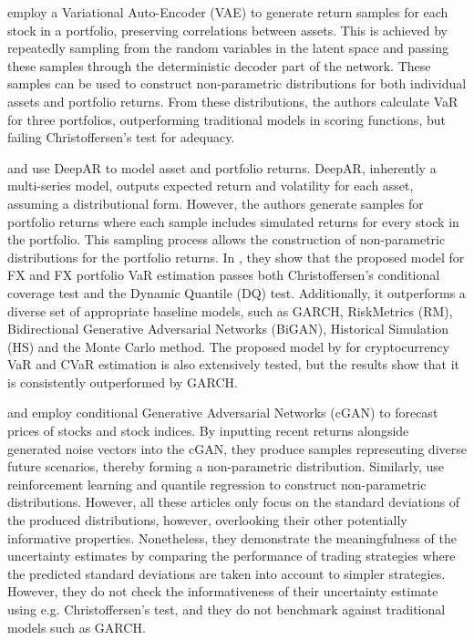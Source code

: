 \textcite{arian2022encoded} employ a Variational Auto-Encoder (VAE) to generate return samples for each stock in a portfolio, preserving correlations between assets. This is achieved by repeatedly sampling from the random variables in the latent space and passing these samples through the deterministic decoder part of the network. These samples can be used to construct non-parametric distributions for both individual assets and portfolio returns. From these distributions, the authors calculate VaR for three portfolios, outperforming traditional models in scoring functions, but failing Christoffersen's test for adequacy.

\textcite{Fatouros2023DeepVaR} and \textcite{Almeida2024RiskForecasting} use DeepAR to model asset and portfolio returns. DeepAR, inherently a multi-series model, outputs expected return and volatility for each asset, assuming a distributional form. However, the authors generate samples for portfolio returns where each sample includes simulated returns for every stock in the portfolio. This sampling process allows the construction of non-parametric distributions for the portfolio returns. In \textcite{Fatouros2023DeepVaR}, they show that the proposed model for FX and FX portfolio VaR estimation passes both Christoffersen's conditional coverage test and the Dynamic Quantile (DQ) test. Additionally, it outperforms a diverse set of appropriate baseline models, such as GARCH, RiskMetrics (RM), Bidirectional Generative
Adversarial Networks (BiGAN), Historical Simulation (HS) and the Monte Carlo method. The proposed model by \textcite{Almeida2024RiskForecasting} for cryptocurrency VaR and CVaR estimation is also extensively tested, but the results show that it is consistently outperformed by GARCH.

\textcite{lee2021estimation} and \textcite{vuletic2024finGAN} employ conditional Generative Adversarial Networks (cGAN) to forecast prices of stocks and stock indices. By inputting recent returns alongside generated noise vectors into the cGAN, they produce samples representing diverse future scenarios, thereby forming a non-parametric distribution. Similarly, \textcite{Park2024UncertaintyAware} use reinforcement learning and quantile regression to construct non-parametric distributions. However, all these articles only focus on the standard deviations of the produced distributions, however, overlooking their other potentially informative properties. Nonetheless, they demonstrate the meaningfulness of the uncertainty estimates by comparing the performance of trading strategies where the predicted standard deviations are taken into account to simpler strategies. However, they do not check the informativeness of their uncertainty estimate using e.g. Christoffersen's test, and they do not benchmark against traditional models such as GARCH.

